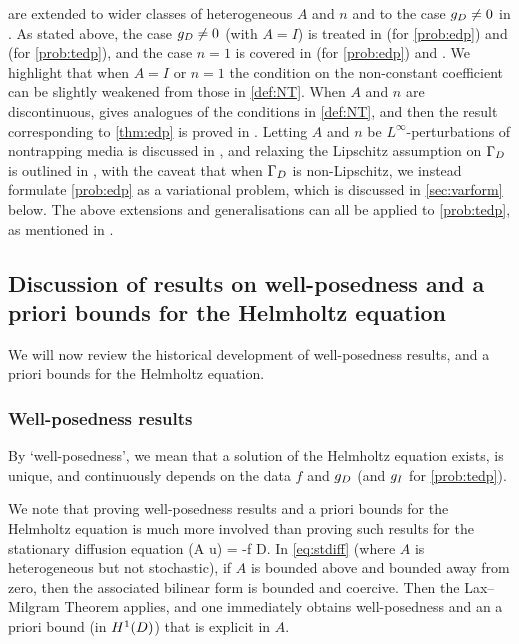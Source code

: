 \label{rem:heteroextensions}
 are extended to wider classes of heterogeneous $A$ and $n$ and to the case $g_{D} \neq 0$ in \cite{GrPeSp:19}. As stated above, the case $g_{D} \neq 0$ (with $A=I$) is treated in \cite[Theorem 2.19(ii)]{GrPeSp:19} (for \cref{prob:edp}) and \cite[Theorem A.6(iv)]{GrPeSp:19} (for \cref{prob:tedp}), and the case $n=1$ is covered in \cite[Theorem 2.19(i)]{GrPeSp:19} (for \cref{prob:edp}) and \cite[Theorem A.6(ii)]{GrPeSp:19}. We highlight that when $A=I$ or $n=1$ the condition on the non-constant coefficient can be slightly weakened from those in \cref{def:NT}. When $A$ and $n$ are discontinuous, \cite[Condition 2.6]{GrPeSp:19} gives analogues of the conditions in \cref{def:NT}, and then the result corresponding to \cref{thm:edp} is proved in \cite[Theorem 2.7]{GrPeSp:19}. Letting $A$ and $n$ be $L^\infty$-perturbations of nontrapping media is discussed in \cite[Remark 2.15]{GrPeSp:19}, and relaxing the Lipschitz assumption on $\Gamma_{D}$ is outlined in \cite[Remark 2.13]{GrPeSp:19}, with the caveat that when $\Gamma_{D}$ is non-Lipschitz, we instead formulate \cref{prob:edp} as a variational problem, which is discussed in \cref{sec:varform} below. The above extensions and generalisations can all be applied to \cref{prob:tedp}, as mentioned in \cite[p. 2916]{GrPeSp:19}.
\ere
\subsection{Discussion of results on well-posedness and a priori bounds for the Helmholtz equation}\label{sec:wpdisc}

We will now review the historical development of well-posedness results, and a priori bounds for the Helmholtz equation.

\subsubsection{Well-posedness results}
By `well-posedness', we mean that a solution of the Helmholtz equation exists, is unique, and continuously depends on the data $f$ and $g_{D}$ (and $g_{I}$ for \cref{prob:tedp}).

We note that proving well-posedness results and a priori bounds for the Helmholtz equation is much more involved than proving such results for the stationary diffusion equation
\beq\label{eq:stdiff}
\grad \cdot \mleft(A \grad u\mright) = -f \tin D.
\eeq
In \eqref{eq:stdiff} (where $A$ is heterogeneous but not stochastic), if $A$ is bounded above and bounded away from zero, then the associated bilinear form is bounded and coercive. Then the Lax--Milgram Theorem applies, and one immediately obtains well-posedness and an a priori bound (in $\HoD$) that is explicit in $A$.

